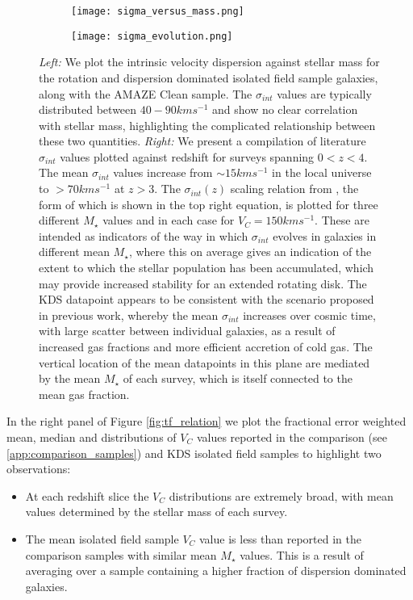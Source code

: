 \documentclass[fleqn,usenatbib]{mn2e}
\begin{document}
\begin{figure*}
    \centering \hspace{-1.3cm}
    \begin{subfigure}[h!]{0.5\textwidth}
        \centering
        \texttt{[image: sigma\_versus\_mass.png]}
    \end{subfigure} \hspace{0.4cm}
    \begin{subfigure}[h!]{0.5\textwidth}
        \centering
        \texttt{[image: sigma\_evolution.png]}
    \end{subfigure}
    \caption{{\it Left:} We plot the intrinsic velocity dispersion against stellar mass for the rotation and dispersion dominated isolated field sample galaxies, along with the AMAZE Clean sample.
    The $\sigma_{int}$ values are typically distributed between $40-90kms^{-1}$ and show no clear correlation with stellar mass, highlighting the complicated relationship between these two quantities. 
    {\it Right:} We present a compilation of literature $\sigma_{int}$ values plotted against redshift for surveys spanning $0 < z < 4$.
    The mean $\sigma_{int}$ values increase from $\sim 15kms^{-1}$ in the local universe to $> 70kms^{-1}$ at $z > 3$.
    The $\sigma_{int}(z)$ scaling relation from \protect\cite{Wisnioski2015}, the form of which is shown in the top right equation, is plotted for three different $M_{\star}$ values and in each case for $V_{C} = 150kms^{-1}$.
    These are intended as indicators of the way in which $\sigma_{int}$ evolves in galaxies in different mean $M_{\star}$, where this on average gives an indication of the extent to which the stellar population has been accumulated, which may provide increased stability for an extended rotating disk.
    The KDS datapoint appears to be consistent with the scenario proposed in previous work, whereby the mean $\sigma_{int}$ increases over cosmic time, with large scatter between individual galaxies, as a result of increased gas fractions and more efficient accretion of cold gas.
    The vertical location of the mean datapoints in this plane are mediated by the mean $M_{\star}$ of each survey, which is itself connected to the mean gas fraction.} 
    \label{fig:sigma_and_v_sigma_w_redshift}
\end{figure*}

In the right panel of Figure \ref{fig:tf_relation} we plot the fractional error weighted mean, median and distributions of $V_{C}$ values reported in the comparison (see \cref{app:comparison_samples}) and KDS isolated field samples to highlight two observations:
\begin{itemize}
    \item At each redshift slice the $V_{C}$ distributions are extremely broad, with mean values determined by the stellar mass of each survey.
    \item The mean isolated field sample $V_{C}$ value is less than reported in the comparison samples with similar mean $M_{\star}$ values.
    This is a result of averaging over a sample containing a higher fraction of dispersion dominated galaxies.
\end{itemize}
\end{document}
